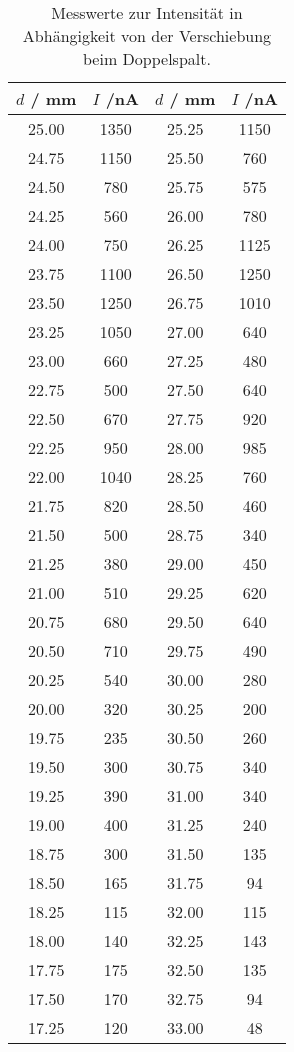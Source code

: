   \begin{table}
    \caption{Messwerte zur Intensität in Abhängigkeit von der Verschiebung beim Doppelspalt.}
    \centering
    \label{tab:messwerte2}
    \begin{tabular}{c c | c c}
      \toprule
$d$ / \si{\milli\meter} & $I$ /\si{\nano\ampere} & $d$ / \si{\milli\meter} & $I$ /\si{\nano\ampere}\\
     \midrule
25.00 & 1350	& 25.25 & 1150 \\
24.75 & 1150	& 25.50 & 760 \\
24.50 & 780	& 25.75 & 575 \\
24.25 & 560	& 26.00 & 780 \\
24.00 & 750	& 26.25 & 1125 \\
23.75 & 1100	& 26.50 & 1250 \\
23.50 & 1250	& 26.75 & 1010 \\
23.25 & 1050 &	27.00 & 640 \\
23.00 & 660	& 27.25 & 480 \\
22.75 & 500	& 27.50 & 640 \\
22.50 & 670	& 27.75 & 920 \\
22.25 & 950	& 28.00 & 985 \\
22.00 & 1040	& 28.25 & 760 \\
21.75 & 820	& 28.50 & 460 \\
21.50 & 500	& 28.75 & 340 \\
21.25 & 380	& 29.00 & 450 \\
21.00 & 510	& 29.25 & 620 \\
20.75 & 680	& 29.50 & 640 \\
20.50 & 710	& 29.75 & 490 \\
20.25 & 540	& 30.00 & 280 \\
20.00 & 320	& 30.25 & 200 \\
19.75 & 235	& 30.50 & 260 \\
19.50 & 300	& 30.75 & 340 \\
19.25 & 390	& 31.00 & 340 \\
19.00 & 400	& 31.25 & 240 \\
18.75 & 300	& 31.50 & 135 \\
18.50 & 165	& 31.75 & 94 \\
18.25 & 115	& 32.00 & 115 \\
18.00 & 140	& 32.25 & 143 \\
17.75 & 175	& 32.50 & 135 \\
17.50 & 170	& 32.75 & 94 \\
17.25 & 120	& 33.00 & 48 \\

\end{tabular}
\end{table}
